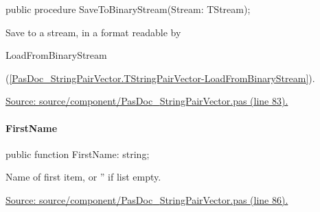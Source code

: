 \documentclass{report}
\newif\ifpdf
\begin{document}
\label{PasDoc_StringPairVector.TStringPairVector-SaveToBinaryStream}
\begin{list}{}{
\setlength{\itemindent}{0cm}
\setlength{\listparindent}{0cm}
\setlength{\leftmargin}{\evensidemargin}
\addtolength{\leftmargin}{\tmplength}
\settowidth{\labelsep}{X}
\addtolength{\leftmargin}{\labelsep}
\setlength{\labelwidth}{\tmplength}
}
\item[\textbf{Declaration}\hfill]
\ifpdf
\begin{flushleft}
\fi
\begin{ttfamily}
public procedure SaveToBinaryStream(Stream: TStream);\end{ttfamily}

\ifpdf
\end{flushleft}
\fi

\par
\item[\textbf{Description}]
Save to a stream, in a format readable by \begin{ttfamily}LoadFromBinaryStream\end{ttfamily}(\ref{PasDoc_StringPairVector.TStringPairVector-LoadFromBinaryStream}).\par
\href{https://github.com/pasdoc/pasdoc/blob/master/source/component/PasDoc_StringPairVector.pas#L83}{Source: source/component/PasDoc{\_}StringPairVector.pas (line 83).}

\end{list}
\paragraph*{FirstName}\hspace*{\fill}

\label{PasDoc_StringPairVector.TStringPairVector-FirstName}
\begin{list}{}{
\setlength{\itemindent}{0cm}
\setlength{\listparindent}{0cm}
\setlength{\leftmargin}{\evensidemargin}
\addtolength{\leftmargin}{\tmplength}
\settowidth{\labelsep}{X}
\addtolength{\leftmargin}{\labelsep}
\setlength{\labelwidth}{\tmplength}
}
\item[\textbf{Declaration}\hfill]
\ifpdf
\begin{flushleft}
\fi
\begin{ttfamily}
public function FirstName: string;\end{ttfamily}

\ifpdf
\end{flushleft}
\fi

\par
\item[\textbf{Description}]
Name of first item, or '' if list empty.\par
\href{https://github.com/pasdoc/pasdoc/blob/master/source/component/PasDoc_StringPairVector.pas#L86}{Source: source/component/PasDoc{\_}StringPairVector.pas (line 86).}

\end{list}
\end{document}
